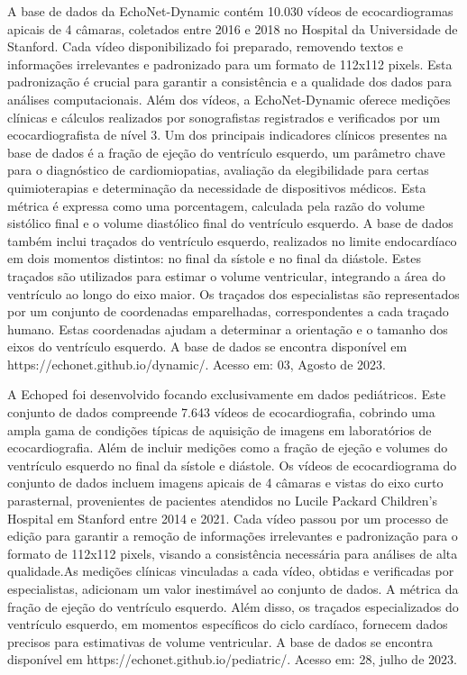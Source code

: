 A base de dados da  EchoNet-Dynamic contém 10.030 vídeos de ecocardiogramas apicais de 4 câmaras, coletados entre 2016 e 2018 no Hospital da Universidade de Stanford. Cada vídeo disponibilizado foi preparado, removendo textos e informações irrelevantes e padronizado para um formato de 112x112 pixels. Esta padronização é crucial para garantir a consistência e a qualidade dos dados para análises computacionais. Além dos vídeos, a EchoNet-Dynamic oferece medições clínicas e cálculos realizados por sonografistas registrados e verificados por um ecocardiografista de nível 3. Um dos principais indicadores clínicos presentes na base de dados é a fração de ejeção do ventrículo esquerdo, um parâmetro chave para o diagnóstico de cardiomiopatias, avaliação da elegibilidade para certas quimioterapias e determinação da necessidade de dispositivos médicos. Esta métrica é expressa como uma porcentagem, calculada pela razão do volume sistólico final  e o volume diastólico final do ventrículo esquerdo. A base de dados  também inclui traçados do ventrículo esquerdo, realizados no limite endocardíaco em dois momentos distintos: no final da sístole e no final da diástole. Estes traçados são utilizados para estimar o volume ventricular, integrando a área do ventrículo ao longo do eixo maior. Os traçados dos especialistas são representados por um conjunto de coordenadas emparelhadas, correspondentes a cada traçado humano. Estas coordenadas ajudam a determinar a orientação e o tamanho dos eixos do ventrículo esquerdo. A base de dados se encontra disponível em https://echonet.github.io/dynamic/. Acesso em: 03, Agosto de 2023.

A Echoped foi desenvolvido focando exclusivamente em dados pediátricos. Este conjunto de dados compreende 7.643 vídeos de ecocardiografia, cobrindo uma ampla gama de condições típicas de aquisição de imagens em laboratórios de ecocardiografia. Além de incluir medições como a fração de ejeção e volumes do ventrículo esquerdo no final da sístole e diástole. Os vídeos de ecocardiograma do conjunto de dados incluem imagens apicais de 4 câmaras e vistas do eixo curto parasternal, provenientes de pacientes atendidos no Lucile Packard Children’s Hospital em Stanford entre 2014 e 2021. Cada vídeo passou por um processo de edição para garantir a remoção de informações irrelevantes e padronização para o formato de 112x112 pixels, visando a consistência necessária para análises de alta qualidade.As medições clínicas vinculadas a cada vídeo, obtidas e verificadas por especialistas, adicionam um valor inestimável ao conjunto de dados. A métrica da fração de ejeção do ventrículo esquerdo. Além disso, os traçados especializados do ventrículo esquerdo, em momentos específicos do ciclo cardíaco, fornecem dados precisos para estimativas de volume ventricular. A base de dados se encontra disponível em https://echonet.github.io/pediatric/. Acesso em: 28, julho de 2023.


